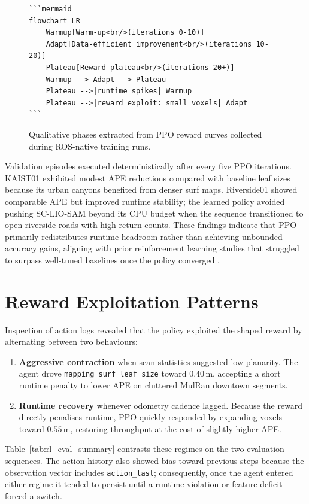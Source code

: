 \begin{figure}[ht]
\centering
\begin{verbatim}
```mermaid
flowchart LR
    Warmup[Warm-up<br/>(iterations 0-10)]
    Adapt[Data-efficient improvement<br/>(iterations 10-20)]
    Plateau[Reward plateau<br/>(iterations 20+)]
    Warmup --> Adapt --> Plateau
    Plateau -->|runtime spikes| Warmup
    Plateau -->|reward exploit: small voxels| Adapt
```
\end{verbatim}
\caption{Qualitative phases extracted from PPO reward curves collected during ROS-native training runs.}
\label{fig:reward_phases}
\end{figure}

Validation episodes executed deterministically after every five PPO iterations. KAIST01 exhibited modest APE reductions compared with baseline leaf sizes because its urban canyons benefited from denser surf maps. Riverside01 showed comparable APE but improved runtime stability; the learned policy avoided pushing SC-LIO-SAM beyond its CPU budget when the sequence transitioned to open riverside roads with high return counts. These findings indicate that PPO primarily redistributes runtime headroom rather than achieving unbounded accuracy gains, aligning with prior reinforcement learning studies that struggled to surpass well-tuned baselines once the policy converged \cite{nicomessikommer_2024_reinforcement}.

\section{Reward Exploitation Patterns}
Inspection of action logs revealed that the policy exploited the shaped reward by alternating between two behaviours:
\begin{enumerate}
    \item \textbf{Aggressive contraction} when scan statistics suggested low planarity. The agent drove \texttt{mapping\_surf\_leaf\_size} toward $0.40$\,m, accepting a short runtime penalty to lower APE on cluttered MulRan downtown segments.
    \item \textbf{Runtime recovery} whenever odometry cadence lagged. Because the reward directly penalises runtime, PPO quickly responded by expanding voxels toward $0.55$\,m, restoring throughput at the cost of slightly higher APE.
\end{enumerate}
Table~\ref{tab:rl_eval_summary} contrasts these regimes on the two evaluation sequences. The action history also showed bias toward previous steps because the observation vector includes \texttt{action\_last}; consequently, once the agent entered either regime it tended to persist until a runtime violation or feature deficit forced a switch.

